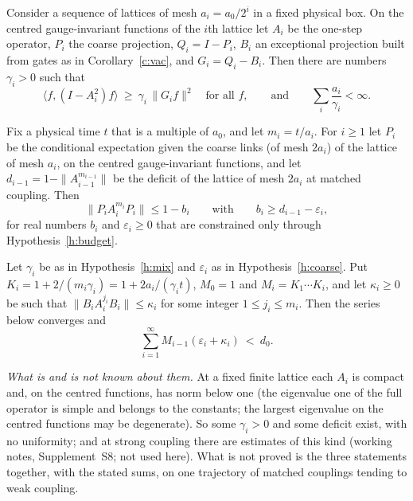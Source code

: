 \begin{hypothesis}\label{h:mix}
Consider a sequence of lattices of mesh $a_i=a_0/2^i$ in a fixed physical box. On the centred
gauge-invariant functions of the $i$th lattice let $A_i$ be the one-step operator, $P_i$ the coarse
projection, $Q_i=I-P_i$, $B_i$ an exceptional projection built from gates as in Corollary~\ref{c:vac}, and
$G_i=Q_i-B_i$. Then there are numbers $\gamma_i>0$ such that
\[
\langle f,(I-A_i^2)f\rangle\ \ge\ \gamma_i\,\|G_if\|^2\quad\text{for all }f,\qquad\text{and}\qquad
\sum_i\frac{a_i}{\gamma_i}<\infty .
\]
\end{hypothesis}

\begin{hypothesis}\label{h:coarse}
Fix a physical time $t$ that is a multiple of $a_0$, and let $m_i=t/a_i$. For $i\ge1$ let $P_i$ be the
conditional expectation given the coarse links (of mesh $2a_i$) of the lattice of mesh $a_i$, on the centred
gauge-invariant functions, and let $d_{i-1}=1-\|A_{i-1}^{m_{i-1}}\|$ be the deficit of the lattice of mesh
$2a_i$ at matched coupling. Then
\[
\|P_iA_i^{m_i}P_i\|\le1-b_i\qquad\text{with}\qquad b_i\ge d_{i-1}-\varepsilon_i ,
\]
for real numbers $b_i$ and $\varepsilon_i\ge0$ that are constrained only through
Hypothesis~\ref{h:budget}.
\end{hypothesis}

\begin{hypothesis}\label{h:budget}
Let $\gamma_i$ be as in Hypothesis~\ref{h:mix} and $\varepsilon_i$ as in Hypothesis~\ref{h:coarse}. Put
$K_i=1+2/(m_i\gamma_i)=1+2a_i/(\gamma_it)$, $M_0=1$ and $M_i=K_1\cdots K_i$, and let $\kappa_i\ge0$ be such
that $\|B_iA_i^{j_i}B_i\|\le\kappa_i$ for some integer $1\le j_i\le m_i$. Then the series below converges and
\[
\sum_{i=1}^\infty M_{i-1}(\varepsilon_i+\kappa_i)\ <\ d_0 .
\]
\end{hypothesis}

\emph{What is and is not known about them.} At a fixed finite lattice each $A_i$ is compact and, on the
centred functions, has norm below one (the eigenvalue one of the full operator is simple and belongs to the
constants; the largest eigenvalue on the centred functions may be degenerate). So some $\gamma_i>0$ and some
deficit exist, with no uniformity; and at strong coupling there are estimates of this kind (working notes,
Supplement~S8; not used here). What is not proved is the three statements together, with the stated sums, on
one trajectory of matched couplings tending to weak coupling.

